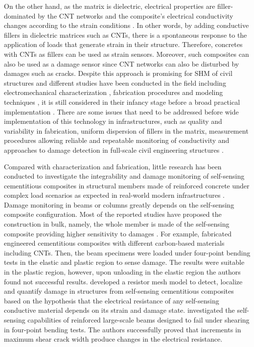 \documentclass[twocolumn]{bmcart}%
\begin{document}
On the other hand, as the matrix is dielectric, electrical properties are filler-dominated by the CNT networks and the composite’s electrical conductivity changes according to the strain conditions \cite{Tian2019a}.  In other words, by adding conductive fillers in dielectric matrices such as CNTs, there is a spontaneous response to the application of loads that generate strain in their structure. Therefore, concretes with CNTs as fillers can be used as strain sensors. Moreover, such composites can also be used as a damage sensor since CNT networks can also be disturbed by damages such as cracks.
Despite this approach is promising for SHM of civil structures and different studies have been conducted in the field including electromechanical characterization \cite{Ubertini2014, Meoni2018a, Liu2019, Kim2019a}, fabrication procedures \cite{DAlessandro2016, Parvaneh2019a} and modeling techniques \cite{Garcia-Macias2017, Eftekhari2014, Garcia-Macias2018b}, it is still considered in their infancy stage before a broad practical implementation \cite{Taheri2019a}. There are some issues that need to be addressed before wide implementation of this technology in infrastructures, such as quality and variability in fabrication, uniform dispersion of fillers in the matrix, measurement procedures allowing reliable and repeatable monitoring of conductivity and approaches to damage detection in full-scale civil engineering structures \cite{Tian2019a, DAlessandro2016a, Shi2019b}.

Compared with characterization and fabrication, little research has been conducted to investigate the integrability and damage monitoring of self-sensing cementitious composites in structural members made of reinforced concrete under complex load scenarios as expected in real-world modern infrastructures \cite{Lagason2016, You2017, Al-Dahawi2017a, Naeem2017a}. Damage monitoring in beams or columns greatly depends on the self-sensing composite configuration. 
Most of the reported studies have proposed the construction in bulk, namely, the whole member is made of the self-sensing composite providing higher sensitivity to damages \cite{Hannan2018a, Lagason2016, Al-Dahawi2017a, Downey2017a, Gupta2017a, You2017, Yldrm2018}. For example, \cite{Al-Dahawi2017a} fabricated engineered cementitious composites with different carbon-based materials including CNTs. Then, the beam specimens were loaded under four-point bending tests in the elastic and plastic region to sense damage. The results were suitable in the plastic region, however, upon unloading in the elastic region the authors found not successful results. \cite{Downey2017} developed a resistor mesh model to detect, localize and quantify damage in structures from self-sensing cementitious composites based on the hypothesis that the electrical resistance of any self-sensing conductive material depends on its strain and damage state. \cite{Yldrm2018} investigated the self-sensing capabilities of reinforced large-scale beams designed to fail under shearing in four-point bending tests. The authors successfully proved that increments in maximum shear crack width produce changes in the electrical resistance.
\end{document}
